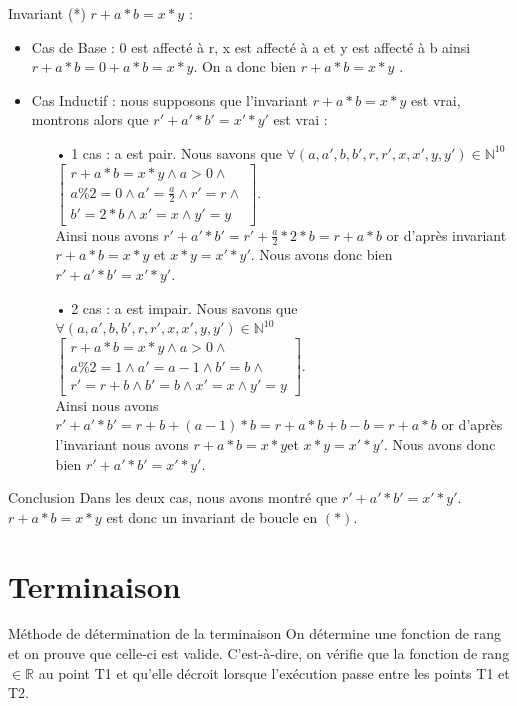 \documentclass[12pt,a4paper]{report}
\begin{document}
\begin{flushleft}
Invariant (*) $r+a*b = x*y$ :
\begin{itemize}
\item Cas de Base : 0   est affecté à r, x  est affecté à a  et y   est affecté à b  ainsi $ r +a*b = 0 + a*b = x*y $. On a donc bien $ r + a*b = x*y$ .
\item Cas Inductif : nous supposons que l'invariant  $ r + a*b = x*y$ est vrai, montrons alors que  $ r' + a'*b' = x'*y'$ est vrai :
\begin{itemize}
\item[•]  1 cas : a est pair.  Nous savons que $\forall(a,a',b,b',r,r',x,x',y,y')\in \mathbb{N}^{10}$ $\left[ \begin{array}{c} r + a*b = x*y\wedge a>0\wedge \\
a\%2=0\wedge a'= \frac{a}{2} \wedge r'=r \wedge\\
b'=2*b\wedge x'=x \wedge y'=y\end{array}
\right]$. \\ Ainsi nous avons $ r' + a'*b' = r' + \frac{a}{2} * 2 * b  = r+ a*b$ or d’après
 invariant $ r+a*b = x*y $ et  $ x*y = x'*y'$. Nous avons donc bien $ r'+a'*b' = x'*y'$.
\item[•] 2 cas : a est impair. Nous savons que $\forall(a,a',b,b',r,r',x,x',y,y')\in \mathbb{N}^{10}$ $\left[ \begin{array}{c} r + a*b = x*y\wedge a>0\wedge \\
a\%2=1\wedge a'= a-1\wedge b'=b \wedge\\
r'=r+b\wedge b'=b\wedge x'=x \wedge y'=y\end{array}
\right]$. \\ Ainsi nous avons $r'+ a'*b'=r+b+(a-1)*b = r+a*b + b-b = r+a*b  $ or d’après l'invariant nous avons  $ r+a*b = x*y $et $ x*y = x'*y' $. Nous avons donc bien $ r'+a'*b' = x'*y'$.
\end{itemize}
\end{itemize}
\begin{Cas1}{Conclusion}
 Dans les deux cas, nous avons montré que $ r'+a'*b'= x'*y' $.
$ r+a*b=x*y $ est donc un invariant de boucle en $(*) $.
\end{Cas1}
\end{flushleft}
\bigskip 
\bigskip
\bigskip

\section*{Terminaison}
\begin{mybox}{Méthode de détermination de la terminaison}
On détermine une fonction de rang et on prouve que celle-ci est valide. C'est-à-dire, on vérifie que la fonction de rang $\in\mathbb{R}$ au point T1 et qu'elle décroit lorsque l'exécution passe entre les points T1 et T2.
\end{mybox}
\end{document}
